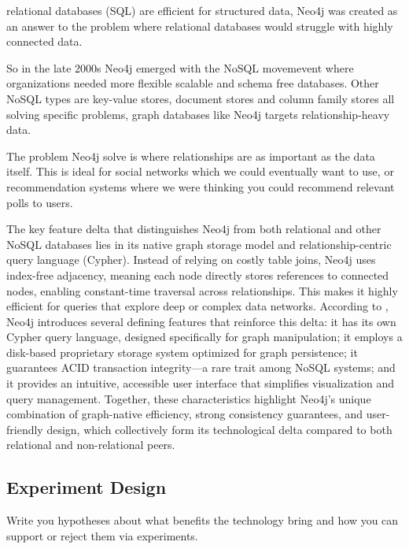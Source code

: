 relational databases (SQL) are efficient for structured data, Neo4j was created as an answer to the problem where relational databases would struggle with highly connected data. 

So in the late 2000s Neo4j emerged with the NoSQL movemevent where organizations needed more flexible scalable and schema free databases. Other NoSQL types are key-value stores, document stores and column family stores all solving specific problems, graph databases like Neo4j targets relationship-heavy data.

The problem Neo4j solve is where relationships are as important as the data itself. This is ideal for social networks which we could eventually want to use, or recommendation systems where we were thinking you could recommend relevant polls to users.

The key feature delta that distinguishes Neo4j from both relational and other NoSQL databases lies in its native graph storage model and relationship-centric query language (Cypher). Instead of relying on costly table joins, Neo4j uses index-free adjacency, meaning each node directly stores references to connected nodes, enabling constant-time traversal across relationships. This makes it highly efficient for queries that explore deep or complex data networks.
According to \cite{guia2017neo4j}, Neo4j introduces several defining features that reinforce this delta: it has its own Cypher query language, designed specifically for graph manipulation; it employs a disk-based proprietary storage system optimized for graph persistence; it guarantees ACID transaction integrity—a rare trait among NoSQL systems; and it provides an intuitive, accessible user interface that simplifies visualization and query management.
Together, these characteristics highlight Neo4j’s unique combination of graph-native efficiency, strong consistency guarantees, and user-friendly design, which collectively form its technological delta compared to both relational and non-relational peers.

\subsection{Experiment Design}

Write you hypotheses about what benefits the technology bring and how you can support or reject them via experiments.
\\
\\


